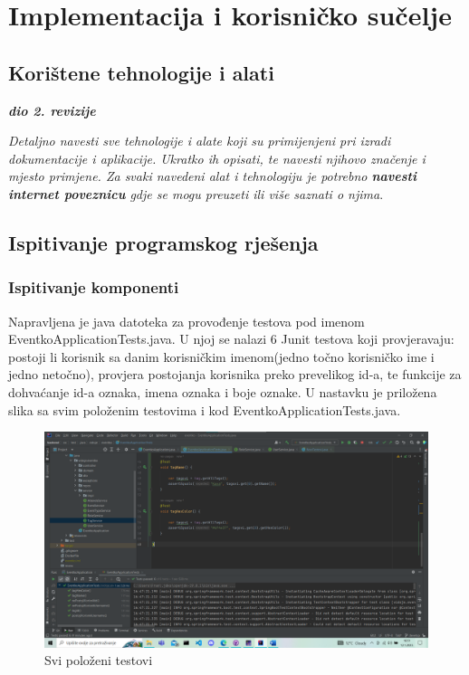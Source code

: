 \chapter{Implementacija i korisničko sučelje}
		
		
		\section{Korištene tehnologije i alati}
		
			\textbf{\textit{dio 2. revizije}}
			
			 \textit{Detaljno navesti sve tehnologije i alate koji su primijenjeni pri izradi dokumentacije i aplikacije. Ukratko ih opisati, te navesti njihovo značenje i mjesto primjene. Za svaki navedeni alat i tehnologiju je potrebno \textbf{navesti internet poveznicu} gdje se mogu preuzeti ili više saznati o njima}.
			
			
			\eject 
		
	
		\section{Ispitivanje programskog rješenja}
			
	
			
			\subsection{Ispitivanje komponenti}
			
			\indent Napravljena je java datoteka za provođenje testova pod imenom EventkoApplicationTests.java. U njoj se nalazi 6 Junit testova koji provjeravaju: postoji li korisnik sa danim korisničkim imenom(jedno točno korisničko ime i jedno netočno), provjera postojanja korisnika preko prevelikog id-a, te funkcije za dohvaćanje id-a oznaka, imena oznaka i boje oznake. U nastavku je priložena slika sa svim položenim testovima i kod EventkoApplicationTests.java.
			
			
			\begin{figure}[H]
				\includegraphics[width=\textwidth]{Slike/TestoviProsli.png}
				\caption{Svi položeni testovi}
			\end{figure}
			
